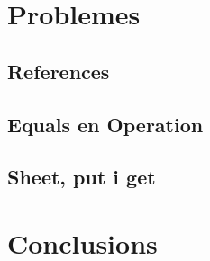\documentclass{article}
\begin{document}
	\section{Problemes}
	\subsection{References}
	\subsection{Equals en Operation}
	\subsection{Sheet, put i get}
	
	\section{Conclusions}
\end{document}
